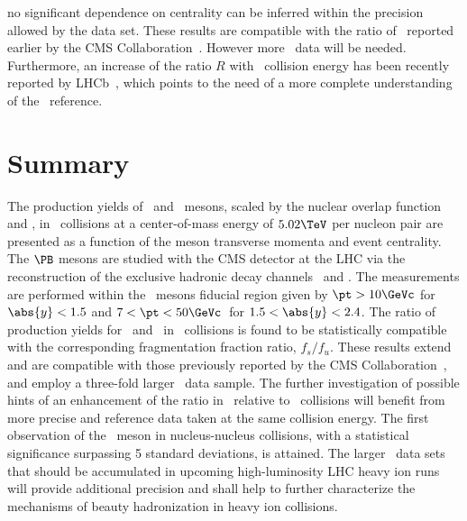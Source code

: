\documentclass[11pt,twoside,a4paper,cmspaper]{cms-tdr}
\begin{document}
no significant dependence on centrality can be inferred within the precision allowed by the data set.
These results are compatible with the ratio of \RAA\ reported earlier by the CMS Collaboration~\cite{BsPbPbCMS}.
However more \PbPb\ data will be needed. Furthermore, an increase of the ratio $R$ with \pp\ collision energy has been recently reported by LHCb~\cite{fsfulhcb2020}, 
which points to the need of a more complete understanding of the \pp\ reference. 


\section{Summary}

The production yields %
of \PBzs\ and \PBp\ mesons,
scaled by the nuclear overlap function \TAA and \NMB,
in \PbPb\ collisions at a center-of-mass energy of $5.02\TeV$ per nucleon pair are presented as a function of the meson transverse momenta and event centrality.
The $\PB$ mesons are studied with the CMS detector at the LHC via the reconstruction of the exclusive hadronic decay channels \Bzerosdecayall\ and \Bplusdecayall. 
The measurements are performed within the \PB\ mesons fiducial region given by 
$\pt>10\GeVc$ for $\abs{y}<1.5$  and  $7<\pt<50\GeVc \,$ for $1.5<\abs{y}<2.4$.
%
The ratio of production yields for \PBzs\ and \PBp\ in \PbPb\ collisions is found to be statistically compatible with the corresponding fragmentation fraction ratio, $f_s/f_u$.  
%
These results extend and are compatible with those previously reported by the CMS Collaboration~\cite{BsPbPbCMS,BpPbPbCMS}, and employ a three-fold larger \PbPb\ data sample.
The further investigation of possible hints of an enhancement of the ratio in \PbPb\ relative to \pp\ collisions will benefit from more precise \PbPb and \pp reference data taken at the same collision energy.  
The first observation of the \PBzs\ meson in nucleus-nucleus collisions, with a statistical significance surpassing 5 standard deviations, is attained. 
%
The larger \PbPb\ data sets that should be accumulated in upcoming high-luminosity LHC heavy ion runs will provide additional precision and shall help to further characterize the mechanisms of beauty hadronization in heavy ion collisions.
\end{document}
